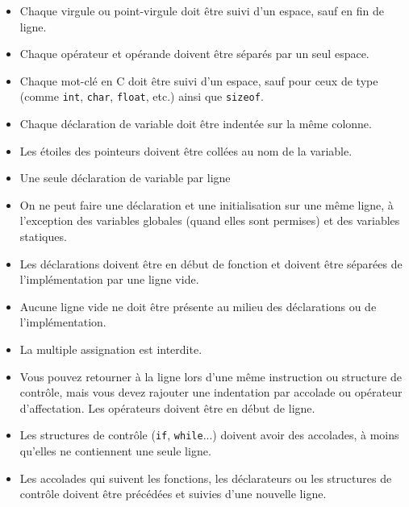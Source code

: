 \documentclass{42-fr}
\begin{document}
\begin{itemize}
                \item Chaque virgule ou point-virgule doit être suivi d’un espace, sauf en fin de ligne.

                \item Chaque opérateur et opérande doivent être séparés par un seul espace.

                \item Chaque mot-clé en C doit être suivi d’un espace, sauf pour ceux
                    de type (comme \texttt{int}, \texttt{char}, \texttt{float}, etc.) ainsi que \texttt{sizeof}.

                \item Chaque déclaration de variable doit être indentée sur la même colonne.

                \item Les étoiles des pointeurs doivent être collées au nom de la variable.

                \item Une seule déclaration de variable par ligne

                \item On ne peut faire une déclaration et une initialisation sur une même ligne,
                    à l’exception des variables globales (quand elles sont permises) et des variables statiques.

                \item Les déclarations doivent être en début de fonction et doivent être séparées 
                    de l’implémentation par une ligne vide.

                \item Aucune ligne vide ne doit être présente au milieu des déclarations ou de l’implémentation.

                \item La multiple assignation est interdite.

                \item Vous pouvez retourner à la ligne lors d’une même instruction ou structure de
                    contrôle, mais vous devez rajouter une indentation par accolade ou opérateur
                    d’affectation. Les opérateurs doivent être en début de ligne.

                \item Les structures de contrôle (\texttt{if}, \texttt{while}...) doivent avoir des accolades, à moins qu'elles
                    ne contiennent une seule ligne.
                
                \item Les accolades qui suivent les fonctions, les déclarateurs ou les structures de contrôle doivent être précédées et suivies d'une nouvelle ligne.

            \end{itemize}
\end{document}
